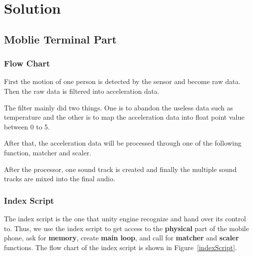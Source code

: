 \section{Solution}

\subsection{Moblie Terminal Part}

\subsubsection{Flow Chart}

\hspace*{2em}First the motion of one person is detected by the sensor and become raw data.
   Then the raw data is filtered into acceleration data. 

   The filter mainly did two things.
   One is to abandon the useless data such as temperature and the other is to
   map the acceleration data into float point value between 0 to 5. 

   After that, the acceleration data will be processed through one of the
   following function, matcher and scaler. 

   After the processor, one sound track is created and finally the multiple
   sound tracks are mixed into the final audio. 

\subsubsection{Index Script}

The index script is the one that unity engine recognize and hand over its
control to. 
Thus, we use the index script to get access to the \textbf{physical} part of the
mobile phone, ask for \textbf{memory}, create \textbf{main loop}, and call for
\textbf{matcher} and \textbf{scaler} functions.
The flow chart of the index script is shown in Figure~\ref{indexScript}.

